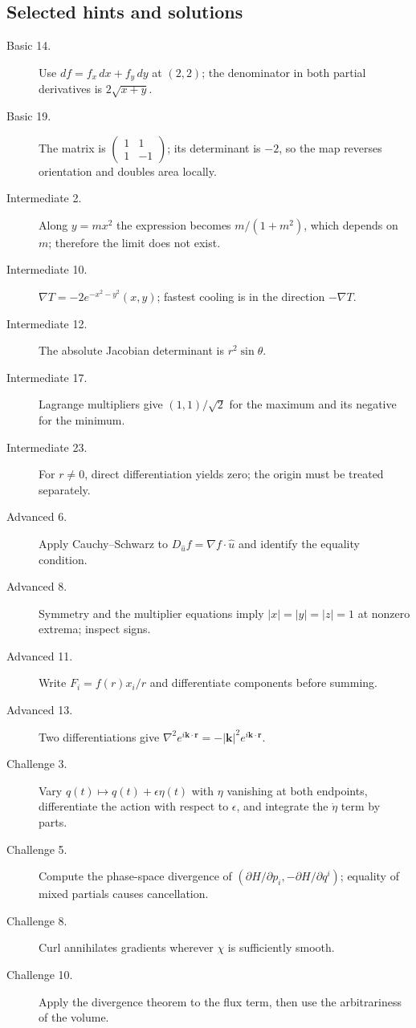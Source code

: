\subsection{Selected hints and solutions}
\begin{description}
\item[Basic 14.] Use $df=f_x\,dx+f_y\,dy$ at $(2,2)$; the denominator in both partial derivatives is $2\sqrt{x+y}$.
\item[Basic 19.] The matrix is $\begin{pmatrix}1&1\\1&-1\end{pmatrix}$; its determinant is $-2$, so the map reverses orientation and doubles area locally.
\item[Intermediate 2.] Along $y=mx^2$ the expression becomes $m/(1+m^2)$, which depends on $m$; therefore the limit does not exist.
\item[Intermediate 10.] $\nabla T=-2e^{-x^2-y^2}(x,y)$; fastest cooling is in the direction $-\nabla T$.
\item[Intermediate 12.] The absolute Jacobian determinant is $r^2\sin\theta$.
\item[Intermediate 17.] Lagrange multipliers give $(1,1)/\sqrt2$ for the maximum and its negative for the minimum.
\item[Intermediate 23.] For $r\ne0$, direct differentiation yields zero; the origin must be treated separately.
\item[Advanced 6.] Apply Cauchy--Schwarz to $D_{\hat u}f=\nabla f\cdot\hat u$ and identify the equality condition.
\item[Advanced 8.] Symmetry and the multiplier equations imply $|x|=|y|=|z|=1$ at nonzero extrema; inspect signs.
\item[Advanced 11.] Write $F_i=f(r)x_i/r$ and differentiate components before summing.
\item[Advanced 13.] Two differentiations give $\nabla^2e^{i\mathbf k\cdot\mathbf r}=-|\mathbf k|^2e^{i\mathbf k\cdot\mathbf r}$.
\item[Challenge 3.] Vary $q(t)\mapsto q(t)+\epsilon\eta(t)$ with $\eta$ vanishing at both endpoints, differentiate the action with respect to $\epsilon$, and integrate the $\dot\eta$ term by parts.
\item[Challenge 5.] Compute the phase-space divergence of $(\partial H/\partial p_i,-\partial H/\partial q^i)$; equality of mixed partials causes cancellation.
\item[Challenge 8.] Curl annihilates gradients wherever $\chi$ is sufficiently smooth.
\item[Challenge 10.] Apply the divergence theorem to the flux term, then use the arbitrariness of the volume.
\end{description}
